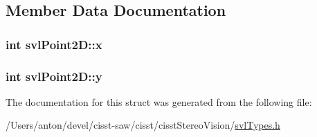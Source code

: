\subsection{Member Data Documentation}
\hypertarget{structsvl_point2_d_a6993df11112bf2ed7acaf97215988ba7}{}
\subsubsection[{x}]{\setlength{\rightskip}{0pt plus 5cm}int svl\+Point2\+D\+::x}\label{structsvl_point2_d_a6993df11112bf2ed7acaf97215988ba7}
\hypertarget{structsvl_point2_d_a64c9c29fe5dda7ff0e2c956fc227e6c9}{}
\subsubsection[{y}]{\setlength{\rightskip}{0pt plus 5cm}int svl\+Point2\+D\+::y}\label{structsvl_point2_d_a64c9c29fe5dda7ff0e2c956fc227e6c9}


The documentation for this struct was generated from the following file\+:\begin{DoxyCompactItemize}
\item 
/\+Users/anton/devel/cisst-\/saw/cisst/cisst\+Stereo\+Vision/\hyperlink{svl_types_8h}{svl\+Types.\+h}\end{DoxyCompactItemize}
